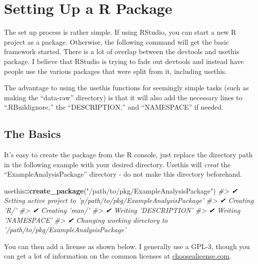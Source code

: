 \documentclass[]{book}
\newenvironment{Shaded}{\begin{snugshade}}{\end{snugshade}}
\newcommand{\CommentTok}[1]{\textcolor[rgb]{0.56,0.35,0.01}{\textit{#1}}}
\newcommand{\DataTypeTok}[1]{\textcolor[rgb]{0.13,0.29,0.53}{#1}}
\newcommand{\KeywordTok}[1]{\textcolor[rgb]{0.13,0.29,0.53}{\textbf{#1}}}
\newcommand{\NormalTok}[1]{#1}
\newcommand{\OperatorTok}[1]{\textcolor[rgb]{0.81,0.36,0.00}{\textbf{#1}}}
\newcommand{\StringTok}[1]{\textcolor[rgb]{0.31,0.60,0.02}{#1}}
\begin{document}
\hypertarget{setting-up-a-r-package}{%
\section{Setting Up a R Package}\label{setting-up-a-r-package}}

The set up process is rather simple. If using RStudio, you can start a new R project as a package. Otherwise, the following command will get the basic framework started. There is a lot of overlap between the devtools and usethis package. I believe that RStudio is trying to fade out devtools and instead have people use the various packages that were split from it, including usethis.

The advantage to using the usethis functions for seemingly simple tasks (such as making the ``data-raw'' directory) is that it will also add the necessary lines to ``.RBuildignore,'' the ``DESCRIPTION,'' and ``NAMESPACE'' if needed.

\hypertarget{the-basics}{%
\subsection{The Basics}\label{the-basics}}

It's easy to create the package from the R console, just replace the directory path in the following example with your desired directory. Usethis will \emph{creat} the ``ExampleAnalysisPackage'' directory - do not make this directory beforehand.

\begin{Shaded}
\begin{Highlighting}[]
\NormalTok{usethis}\OperatorTok{::}\KeywordTok{create_package}\NormalTok{(}\StringTok{"/path/to/pkg/ExampleAnalysisPackage"}\NormalTok{)}
\CommentTok{#> ✔ Setting active project to 'p/path/to/pkg/ExampleAnalysisPackage'}
\CommentTok{#> ✔ Creating 'R/'}
\CommentTok{#> ✔ Creating 'man/'}
\CommentTok{#> ✔ Writing 'DESCRIPTION'}
\CommentTok{#> ✔ Writing 'NAMESPACE'}
\CommentTok{#> ✔ Changing working directory to '/path/to/pkg/ExampleAnalysisPackage'}
\end{Highlighting}
\end{Shaded}

You can then add a license as shown below. I generally use a GPL-3, though you can get a lot of information on the common licenses at \href{https://choosealicense.com}{choosealicense.com}.

\begin{Shaded}
\end{Shaded}
\end{document}
